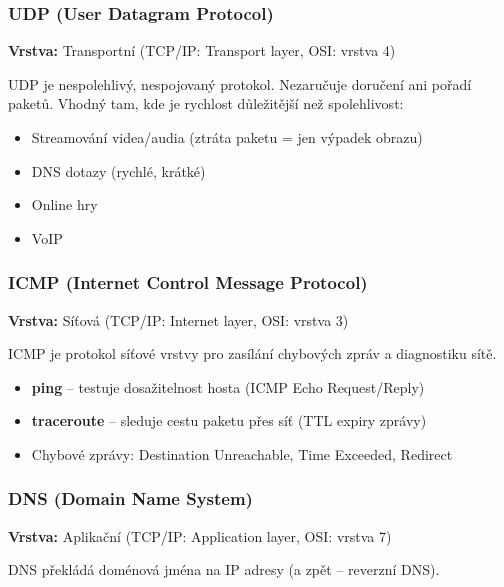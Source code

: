 \subsubsection{UDP (User Datagram Protocol)}

\textbf{Vrstva:} Transportní (TCP/IP: Transport layer, OSI: vrstva 4)

UDP je nespolehlivý, nespojovaný protokol. Nezaručuje doručení ani pořadí paketů.
Vhodný tam, kde je rychlost důležitější než spolehlivost:
\begin{itemize}
  \item Streamování videa/audia (ztráta paketu = jen výpadek obrazu)
  \item DNS dotazy (rychlé, krátké)
  \item Online hry
  \item VoIP
\end{itemize}

\subsubsection{ICMP (Internet Control Message Protocol)}

\textbf{Vrstva:} Síťová (TCP/IP: Internet layer, OSI: vrstva 3)

ICMP je protokol síťové vrstvy pro zasílání chybových zpráv a diagnostiku sítě.
\begin{itemize}
  \item \textbf{ping} -- testuje dosažitelnost hosta (ICMP Echo Request/Reply)
  \item \textbf{traceroute} -- sleduje cestu paketu přes síť (TTL expiry zprávy)
  \item Chybové zprávy: Destination Unreachable, Time Exceeded, Redirect
\end{itemize}

\subsubsection{DNS (Domain Name System)}

\textbf{Vrstva:} Aplikační (TCP/IP: Application layer, OSI: vrstva 7)

DNS překládá doménová jména na IP adresy (a zpět -- reverzní DNS).

